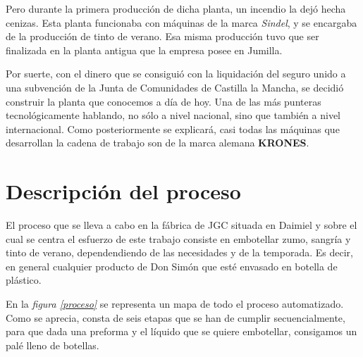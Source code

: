\documentclass[11pt,a4paper,spanish,twoside]{report}
\begin{document}
Pero durante la primera producción de dicha planta, un incendio la dejó hecha
cenizas. Esta planta funcionaba con máquinas de la marca \emph{Sindel}, y se 
encargaba de la producción de tinto de verano. Esa misma producción tuvo que
ser finalizada en la planta antigua que la empresa posee en Jumilla.

Por suerte, con el dinero que se consiguió con la liquidación del seguro unido
a una subvención de la Junta de Comunidades de Castilla la Mancha, se decidió
construir la planta que conocemos a día de hoy. Una de las más punteras
tecnológicamente hablando, no sólo a nivel nacional, sino que también a nivel
internacional. Como posteriormente se explicará, casi todas las máquinas que
desarrollan la cadena de trabajo son de la marca alemana \textbf{KRONES}.

\chapter{Descripción del proceso}
El proceso que se lleva a cabo en la fábrica de JGC situada en Daimiel y
sobre el cual se centra el esfuerzo de este trabajo consiste en embotellar
zumo, sangría y tinto de verano, dependendiendo de las necesidades y de la
temporada. Es decir, en general cualquier producto de Don Simón que esté 
envasado en botella de plástico.

En la \emph{figura \ref{proceso}} se representa un mapa de todo el proceso
automatizado. Como se aprecia, consta de seis etapas que se han de cumplir
secuencialmente, para que dada una preforma y el líquido que se quiere
embotellar, consigamos un palé lleno de botellas.
\end{document}
